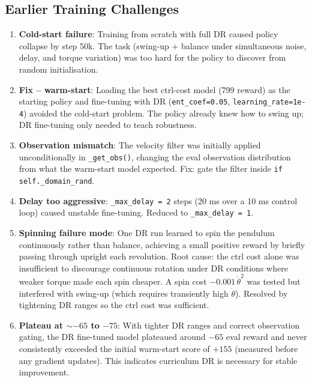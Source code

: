 \documentclass[12pt,a4paper]{article}
\begin{document}
\subsection{Earlier Training Challenges}

\begin{enumerate}
    \item \textbf{Cold-start failure}: Training from scratch with full DR
          caused policy collapse by step 50k. The task (swing-up + balance
          under simultaneous noise, delay, and torque variation) was too hard
          for the policy to discover from random initialisation.

    \item \textbf{Fix -- warm-start}: Loading the best ctrl-cost model
          (799 reward) as the starting policy and fine-tuning with DR
          (\texttt{ent\_coef=0.05}, \texttt{learning\_rate=1e-4}) avoided the
          cold-start problem. The policy already knew how to swing up;
          DR fine-tuning only needed to teach robustness.

    \item \textbf{Observation mismatch}: The velocity filter was initially
          applied unconditionally in \texttt{\_get\_obs()}, changing the
          eval observation distribution from what the warm-start model expected.
          Fix: gate the filter inside \texttt{if self.\_domain\_rand}.

    \item \textbf{Delay too aggressive}: \texttt{\_max\_delay = 2} steps
          (20 ms over a 10 ms control loop) caused unstable fine-tuning.
          Reduced to \texttt{\_max\_delay = 1}.

    \item \textbf{Spinning failure mode}: One DR run learned to spin the
          pendulum continuously rather than balance, achieving a small positive
          reward by briefly passing through upright each revolution. Root cause:
          the ctrl cost alone was insufficient to discourage continuous rotation
          under DR conditions where weaker torque made each spin cheaper.
          A spin cost $-0.001\,\dot\theta^2$ was tested but interfered with
          swing-up (which requires transiently high $\dot\theta$). Resolved by
          tightening DR ranges so the ctrl cost was sufficient.

    \item \textbf{Plateau at $\sim$$-65$ to $-75$}: With tighter DR ranges
          and correct observation gating, the DR fine-tuned model plateaued
          around $-65$ eval reward and never consistently exceeded the initial
          warm-start score of $+155$ (measured before any gradient updates).
          This indicates curriculum DR is necessary for stable improvement.
\end{enumerate}
\end{document}
